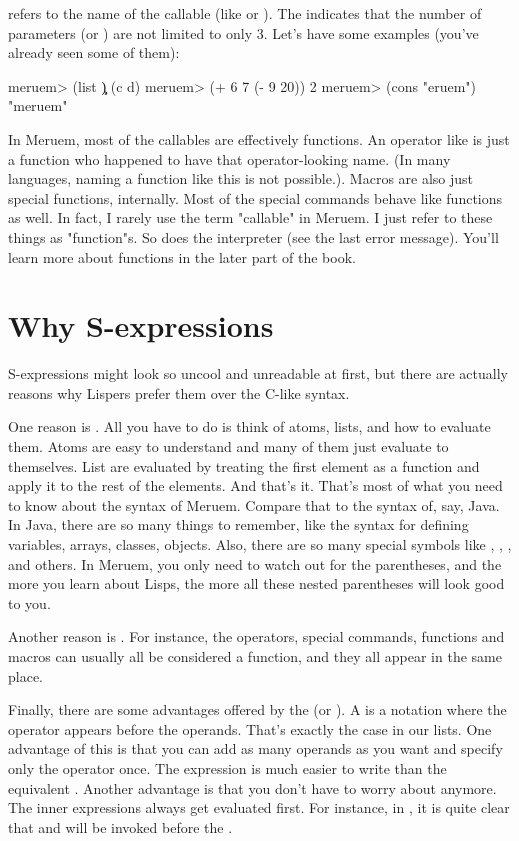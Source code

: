  refers to the name of the callable (like  or \code{++}). The  indicates that the number of parameters (or ) are not limited to only 3. Let's have some examples (you've already seen some of them):

\begin{REPL}
meruem> (list \c \d)
(c d)
meruem> (+ 6 7 (- 9 20))
2
meruem> (cons \m "eruem")
"meruem"
\end{REPL}

In Meruem, most of the callables are effectively functions. An operator like \code{+} is just a function who happened to have that operator-looking name. (In many languages, naming a function like this is not possible.). Macros are also just special functions, internally. Most of the special commands behave like functions as well. In fact, I rarely use the term "callable" in Meruem. I just refer to these things as "function"s. So does the interpreter (see the last error message). You'll learn more about functions in the later part of the book.

\section{Why S-expressions}
S-expressions might look so uncool and unreadable at first, but there are actually reasons why Lispers prefer them over the C-like syntax. 

One reason is . All you have to do is think of atoms, lists, and how to evaluate them. Atoms are easy to understand and many of them just evaluate to themselves. List are evaluated by treating the first element as a function and apply it to the rest of the elements. And that's it. That's most of what you need to know about the syntax of Meruem. Compare that to the syntax of, say, Java. In Java, there are so many things to remember, like the syntax for defining variables, arrays, classes, objects. Also, there are so many special symbols like \code{()}, \code{[]}, \code{<>}, \code{\{\}} and others. In Meruem, you only need to watch out for the parentheses, and the more you learn about Lisps, the more all these nested parentheses will look good to you.

Another reason is . For instance, the operators, special commands, functions and macros can usually all be considered a function, and they all appear in the same place. 

Finally, there are some advantages offered by the  (or ). A  is a notation where the operator appears before the operands. That's exactly the case in our lists. One advantage of this is that you can add as many operands as you want and specify only the operator once. The expression  is much easier to write than the  equivalent . Another advantage is that you don't have to worry about  anymore. The inner expressions always get evaluated first. For instance, in , it is quite clear that \code{+} and \code{-} will be invoked before the \code{*}.

